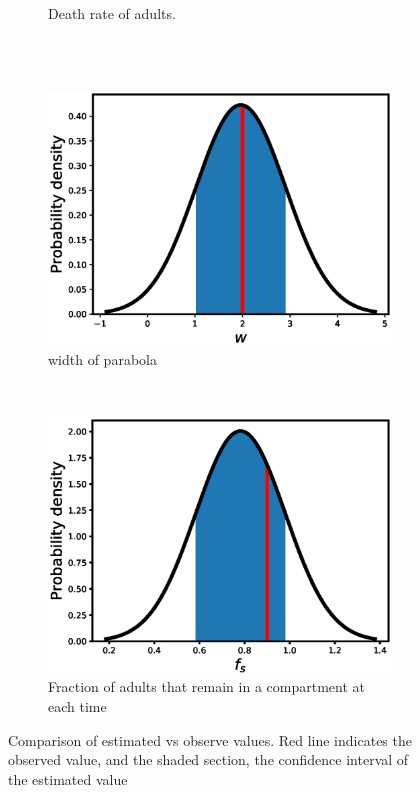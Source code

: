 \documentclass[12pt, table]{article}
\begin{document}
\begin{figure}[H]
\begin{subfigure}[b]{0.45\textwidth}
       \caption{Death rate of adults.}
       \label{fig2f}
   \end{subfigure}\\
   ~ %
   \begin{subfigure}[b]{0.45\textwidth}
       \includegraphics[width=1\textwidth, height=0.24\textheight]{figexple3/fwidth}
        \caption{width of parabola}
       \label{fig2g}
   \end{subfigure}
   ~ %
   \begin{subfigure}[b]{0.45\textwidth}
       \includegraphics[width=1\textwidth, height=0.22\textheight]{figexple3/ffs}
        \caption{Fraction of adults  that remain in a compartment at each time}
       \label{fig2h}
   \end{subfigure}
\caption{Comparison of estimated vs observe values. Red line indicates the observed value, and the shaded section, the confidence interval of the estimated value}
   \label{fig2}
\end{figure}
\end{document}
